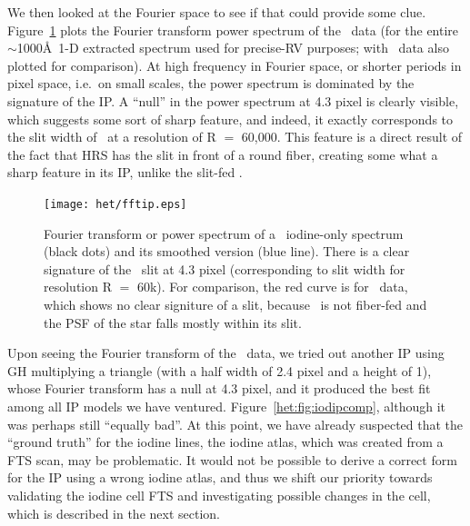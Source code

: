 We then looked at the Fourier space to see if that could provide some
clue. Figure~\ref{het:fig:fftip} plots the Fourier transform power
spectrum of the \het\ data (for the entire $\sim$1000\AA\ 1-D
extracted spectrum used for precise-RV purposes; with \keck\ data
also plotted for comparison). At high frequency in Fourier space, or
shorter periods in pixel space, i.e.\ on small scales, the power
spectrum is dominated by the signature of the IP. A ``null'' in the
power spectrum at 4.3 pixel is clearly visible, which suggests some
sort of sharp feature, and indeed, it exactly corresponds to the slit
width of \het\ at a resolution of R $=$ 60,000. This feature is a
direct result of the fact that HRS has the slit in front of a round
fiber, creating some what a sharp feature in its IP, unlike the
slit-fed \keck. 


\begin{figure}
\centering
\texttt{[image: het/fftip.eps]}
\caption{Fourier transform or power spectrum of a \het\ iodine-only
  spectrum (black dots) and its smoothed version (blue line). There is
  a clear signature of the \het\ slit at 4.3 pixel (corresponding to
  slit width for resolution R $=$ 60k). For comparison, the red curve
  is for \keck\ data, which shows no clear signiture of a slit,
  because \keck\ is not fiber-fed and the PSF of the star falls mostly
  within its slit.
\label{het:fig:fftip}}
\end{figure}


Upon seeing the Fourier transform of the \het\ data, we tried out
another IP using GH multiplying a triangle (with a half width of 2.4
pixel and a height of 1), whose Fourier transform has a null at 4.3
pixel, and it produced the best fit among all IP models we have
ventured. Figure~\ref{het:fig:iodipcomp}, although it was perhaps
still ``equally bad''. At this point, we have already suspected that
the ``ground truth'' for the iodine lines, the iodine atlas, which was
created from a FTS scan, may be problematic. It would not be possible
to derive a correct form for the IP using a wrong iodine atlas, and
thus we shift our priority towards validating the iodine cell FTS and
investigating possible changes in the cell, which is described in the
next section.


